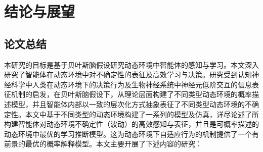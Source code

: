 \chapter{结论与展望}\label{chap:conclusion}
\section{论文总结}
本研究的目标是基于贝叶斯脑假设\cite{beal2003VB,Friston_freeEnergy_2010,daunizeau2010observingA,daunizeau2010observingB,Mathys2011HGF}研究动态环境中智能体的感知与学习。本文深入研究了智能体在动态环境中对不确定性的表征及高效学习与决策。研究受到认知神经科学中人类在动态环境下的决策行为及生物神经系统中神经元低阶交互的信息表征机制的启发，在贝叶斯脑假设下，从理论层面构建了不同类型动态环境的概率描述模型，并且智能体内部以一致的层次化方式抽象表征了不同类型动态环境的不确定性。本文中基于不同类型的动态环境构建了一系列的模型及仿真，详尽论述了所构建智能体对动态环境不确定性（波动）的高效感知与表征，并且是可概率描述的动态环境中最优的学习推断模型。这为动态环境下自适应行为的机制提供了一个有前景的最优的概率解释模型。本文主要开展了下述内容的研究：
